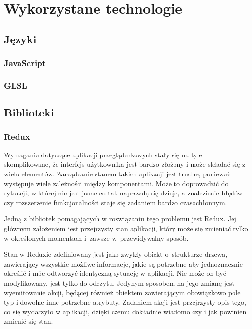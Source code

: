 \documentclass[12pt,a4paper,polish,thesis]{dcsbook}
\begin{document}
{	\section{Wykorzystane technologie}

	\subsection{Języki}

	\subsubsection{JavaScript}

	\subsubsection{GLSL}

	\subsection{Biblioteki}

	\subsubsection{Redux} \label{Redux}

	Wymagania dotyczące aplikacji przeglądarkowych stały się na tyle skomplikowane, że interfejs użytkownika jest bardzo złożony i może składać się z wielu elementów. Zarządzanie stanem takich aplikacji jest trudne, ponieważ występuje wiele zależności między komponentami. Może to doprowadzić do sytuacji, w której nie jest jasne co tak naprawdę się dzieje, a znalezienie błędów czy rozszerzenie funkcjonalności staje się zadaniem bardzo czasochłonnym.

	Jedną z bibliotek pomagających w rozwiązaniu tego problemu jest Redux. Jej głównym założeniem jest przejrzysty stan aplikacji, który może się zmieniać tylko w określonych momentach i~zawsze w~przewidywalny sposób.

	Stan w Reduxie zdefiniowany jest jako zwykły obiekt o~strukturze drzewa, zawierający wszystkie możliwe informacje, jakie są potrzebne aby jednoznacznie określić i móc odtworzyć identyczną sytuację w aplikacji. Nie może on być modyfikowany, jest tylko do odczytu. Jedynym sposobem na jego zmianę jest wyemitowanie akcji, będącej również obiektem zawierającym obowiązkowo pole typ i dowolne inne potrzebne atrybuty. Zadaniem akcji jest przejrzysty opis tego, co się wydarzyło w aplikacji, dzięki czemu dokładnie wiadomo czy i jak powinien zmienić się stan.

}
\end{document}
